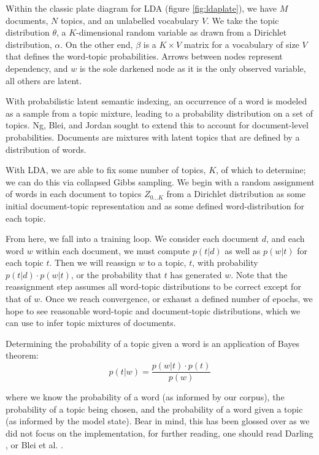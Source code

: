 \documentclass[11pt, twoside, reqno]{book}
\begin{document}
Within the classic plate diagram for LDA (figure \ref{fig:ldaplate}), we have $M$ documents, $N$ topics, and an unlabelled vocabulary $V$. We take the topic distribution $\theta$, a $K$-dimensional random variable as drawn from a Dirichlet distribution, $\alpha$. On the other end, $\beta$ is a $K \times V$ matrix for a vocabulary of size $V$ that defines the word-topic probabilities. Arrows between nodes represent dependency, and $w$ is the sole darkened node as it is the only observed variable, all others are latent.

With probabilistic latent semantic indexing, an occurrence of a word is modeled as a sample from a topic mixture, leading to a probability distribution on a set of topics. Ng, Blei, and Jordan sought to extend this to account for document-level probabilities. Documents are mixtures with latent topics that are defined by a distribution of words.

With LDA, we are able to fix some number of topics, $K$, of which to determine; we can do this via collapsed Gibbs sampling. We begin with a random assignment of words in each document to topics $Z_{0\dots K}$ from a Dirichlet distribution as some initial document-topic representation and as some defined word-distribution for each topic.

From here, we fall into a training loop. We consider each document $d$, and each word $w$ within each document, we must compute $p(t | d)$ as well as $p(w | t)$ for each topic $t$. Then we will reassign $w$ to a topic, $t$, with probability $p(t | d) \cdot p(w | t)$, or the probability that $t$ has generated $w$. Note that the reassignment step assumes all word-topic distributions to be correct except for that of $w$. Once we reach convergence, or exhaust a defined number of epochs, we hope to see reasonable word-topic and document-topic distributions, which we can use to infer topic mixtures of documents.

Determining the probability of a topic given a word is an application of Bayes theorem:
$$p(t | w) = \frac{p(w | t)\cdot p(t)}{p(w)}$$

\noindent where we know the probability of a word (as informed by our corpus), the probability of a topic being chosen, and the probability of a word given a topic (as informed by the model state). Bear in mind, this has been glossed over as we did not focus on the implementation, for further reading, one should read Darling \cite{darlingl99:online}, or Blei et al. \cite{david_m._y._i._1970} \cite{TopicMod43:online}.
\end{document}
